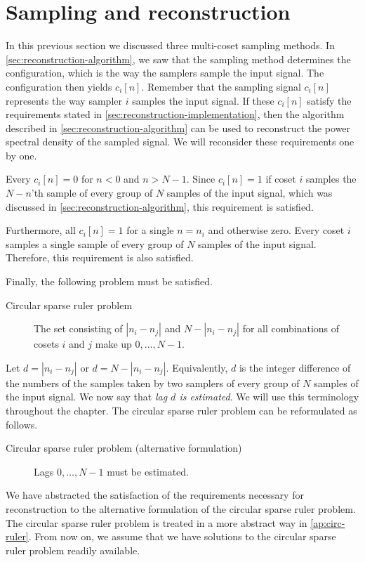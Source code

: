 \documentclass[a4paper, openany, oneside]{memoir}
\begin{document}
\section{Sampling and reconstruction}
In this previous section we discussed three multi-coset sampling methods. In \cref{sec:reconstruction-algorithm}, we saw that the sampling method determines the configuration, which is the way the samplers sample the input signal. The configuration then yields $c_i[n]$. Remember that the sampling signal $c_i[n]$ represents the way sampler $i$ samples the input signal. If these $c_i[n]$ satisfy the requirements stated in \cref{sec:reconstruction-implementation}, then the algorithm described in \cref{sec:reconstruction-algorithm} can be used to reconstruct the power spectral density of the sampled signal. We will reconsider these requirements one by one.

Every $c_i[n]=0$ for $n < 0$ and $n > N-1$. Since $c_i[n]=1$ if coset $i$ samples the $N-n$'th sample of every group of $N$ samples of the input signal, which was discussed in \cref{sec:reconstruction-algorithm}, this requirement is satisfied.

Furthermore, all $c_i[n]=1$ for a single $n=n_i$ and otherwise zero. Every coset $i$ samples a single sample of every group of $N$ samples of the input signal. Therefore, this requirement is also satisfied.

Finally, the following problem must be satisfied.

\begin{description}
    \item[Circular sparse ruler problem] The set consisting of $|n_i - n_j|$ and $N-|n_i-n_j|$ for all combinations of cosets $i$ and $j$ make up $0,\ldots,N-1$.
\end{description}

Let $d=|n_i - n_j|$ or $d=N-|n_i-n_j|$. Equivalently, $d$ is the integer difference of the numbers of the samples taken by two samplers of every group of $N$ samples of the input signal. We now say that \textit{lag $d$ is estimated}. We will use this terminology throughout the chapter. The circular sparse ruler problem can be reformulated as follows.

\begin{description}
    \item[Circular sparse ruler problem (alternative formulation)] Lags $0,\ldots,N-1$ must be estimated.
\end{description}

We have abstracted the satisfaction of the requirements necessary for reconstruction to the alternative formulation of the circular sparse ruler problem. The circular sparse ruler problem is treated in a more abstract way in \cref{ap:circ-ruler}. From now on, we assume that we have solutions to the circular sparse ruler problem readily available.
\end{document}

